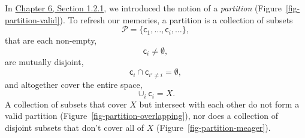 \documentclass[
  letterpaper,
  DIV=11,
  numbers=noendperiod]{scrartcl}
\begin{document}
In
\href{http://www.symplectomorphic.com/assets/chapters_html/density_functions.html\#sigma-finite-measures}{Chapter
6, Section 1.2.1}, we introduced the notion of a \emph{partition}
(Figure~\ref{fig-partition-valid}). To refresh our memories, a partition
is a collection of subsets \[
\mathcal{P}
= \{ \mathsf{c}_{1}, \ldots, \mathsf{c}_{i}, \ldots \},
\] that are each non-empty, \[
\mathsf{c}_{i} \ne \emptyset,
\] are mutually disjoint, \[
\mathsf{c}_{i} \cap \mathsf{c}_{i' \ne i} = \emptyset,
\] and altogether cover the entire space, \[
\cup_{i} \mathsf{c}_{i} = X.
\] A collection of subsets that cover \(X\) but intersect with each
other do not form a valid partition
(Figure~\ref{fig-partition-overlapping}), nor does a collection of
disjoint subsets that don't cover all of \(X\)
(Figure~\ref{fig-partition-meager}).
\end{document}
